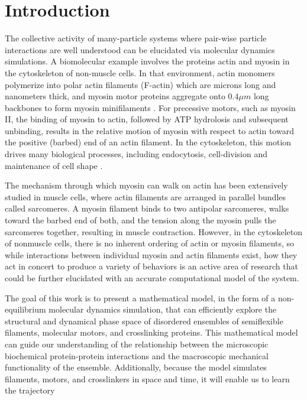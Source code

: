 \documentclass[12pt]{article}
\begin{document}
\section{Introduction} 
The collective activity of many-particle systems where pair-wise particle interactions are well understood 
can be elucidated via molecular dynamics simulations. 
A biomolecular example involves the proteins actin and myosin in the cytoskeleton of non-muscle cells. In that
environment, actin monomers polymerize into polar actin filaments (F-actin) which are microns long and
nanometers thick, and myosin motor proteins aggregate onto $0.4\mu m$ long backbones to form myosin minifilaments \cite{niederman1975}. 
For precessive motors, such as myosin II, the binding of myosin to actin, followed by ATP hydrolosis and subsequent
unbinding, results in the relative motion of myosin with
respect to actin toward the positive (barbed) end of an actin filament. In the cytoskeleton, this
motion drives many biological processes, including endocytosis, cell-division and maintenance of cell shape
\cite{stricker2010, murrell2012}.
\par
The mechanism through which myosin can walk on actin has been extensively studied in muscle cells, where actin
filaments are arranged in parallel bundles called sarcomeres. A myosin filament binds to two antipolar
sarcomeres, walks toward the barbed end of both, and the tension along the myosin pulls the 
sarcomeres together, resulting in muscle contraction\cite{huxley1969}. 
However, in the cytoskeleton of nonmuscle cells, there is no inherent ordering of actin or myosin filaments, so while
interactions between individual myosin and actin filaments exist, how 
they act in concert to produce a variety of behaviors is an active area of research 
that could be further elucidated with an accurate computational model of the 
system\cite{murrell2012, stam2015, murrell2015}. 
\par
The goal of this work is to present a mathematical model, in the form of a non-equilibrium molecular dynamics
simulation, that can efficiently explore the structural and dynamical phase space of 
disordered ensembles of semiflexible filaments, molecular motors, and crosslinking proteins.
This mathematical model can guide our understanding of the relationship between
the microscopic biochemical protein-protein interactions and the macroscopic mechanical functionality of the ensemble. Additionally,
because the model simulates filaments, motors, and crosslinkers in space and time, it will enable us to learn the trajectory
\end{document}

